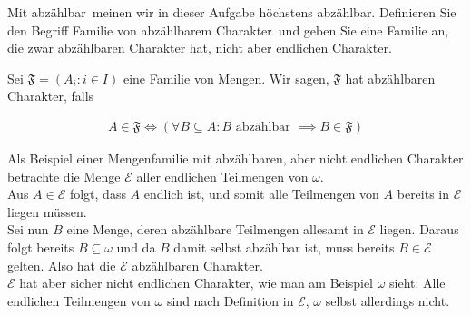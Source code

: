 
\begin{exercise}[278]

Mit \glqq abzählbar\grqq\  meinen wir in dieser Aufgabe \glqq höchstens abzählbar\grqq.
Definieren Sie den Begriff \glqq Familie von abzählbarem Charakter\grqq\ und geben
Sie eine Familie an, die zwar abzählbaren Charakter hat, nicht aber endlichen Charakter.

\end{exercise}


\begin{solution}

Sei $\mathfrak{F} = (A_i: i \in I)$ eine Familie von Mengen. Wir sagen, $\mathfrak{F}$
hat abzählbaren Charakter, falls

\begin{align*}
  A \in \mathfrak{F} \iff (\forall B \subseteq A: B \text{ abzählbar } \implies B \in \mathfrak{F})
\end{align*}

Als Beispiel einer Mengenfamilie mit abzählbaren, aber nicht endlichen Charakter
betrachte die Menge $\mathcal{E}$ aller endlichen Teilmengen von $\omega$. \\
Aus $A \in \mathcal{E}$ folgt, dass $A$ endlich ist, und somit alle Teilmengen
von $A$ bereits in $\mathcal{E}$ liegen müssen. \\
Sei nun $B$ eine Menge, deren abzählbare Teilmengen allesamt in $\mathcal{E}$
liegen. Daraus folgt bereits $B \subseteq \omega$ und da $B$ damit selbst abzählbar ist,
muss bereits $B \in \mathcal{E}$ gelten. Also hat die $\mathcal{E}$ abzählbaren
Charakter. \\
$\mathcal{E}$ hat aber sicher nicht endlichen Charakter, wie man am Beispiel $\omega$
sieht: Alle endlichen Teilmengen von $\omega$ sind nach Definition in $\mathcal{E}$,
$\omega$ selbst allerdings nicht.
\end{solution}

